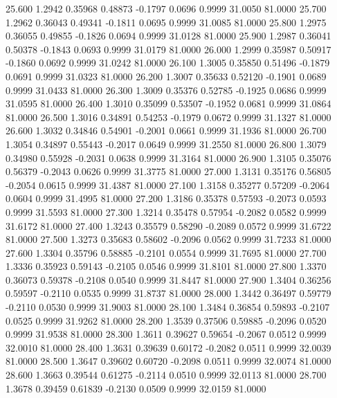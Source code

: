   25.600   1.2942   0.35968   0.48873  -0.1797   0.0696   0.9999  31.0050  81.0000
  25.700   1.2962   0.36043   0.49341  -0.1811   0.0695   0.9999  31.0085  81.0000
  25.800   1.2975   0.36055   0.49855  -0.1826   0.0694   0.9999  31.0128  81.0000
  25.900   1.2987   0.36041   0.50378  -0.1843   0.0693   0.9999  31.0179  81.0000
  26.000   1.2999   0.35987   0.50917  -0.1860   0.0692   0.9999  31.0242  81.0000
  26.100   1.3005   0.35850   0.51496  -0.1879   0.0691   0.9999  31.0323  81.0000
  26.200   1.3007   0.35633   0.52120  -0.1901   0.0689   0.9999  31.0433  81.0000
  26.300   1.3009   0.35376   0.52785  -0.1925   0.0686   0.9999  31.0595  81.0000
  26.400   1.3010   0.35099   0.53507  -0.1952   0.0681   0.9999  31.0864  81.0000
  26.500   1.3016   0.34891   0.54253  -0.1979   0.0672   0.9999  31.1327  81.0000
  26.600   1.3032   0.34846   0.54901  -0.2001   0.0661   0.9999  31.1936  81.0000
  26.700   1.3054   0.34897   0.55443  -0.2017   0.0649   0.9999  31.2550  81.0000
  26.800   1.3079   0.34980   0.55928  -0.2031   0.0638   0.9999  31.3164  81.0000
  26.900   1.3105   0.35076   0.56379  -0.2043   0.0626   0.9999  31.3775  81.0000
  27.000   1.3131   0.35176   0.56805  -0.2054   0.0615   0.9999  31.4387  81.0000
  27.100   1.3158   0.35277   0.57209  -0.2064   0.0604   0.9999  31.4995  81.0000
  27.200   1.3186   0.35378   0.57593  -0.2073   0.0593   0.9999  31.5593  81.0000
  27.300   1.3214   0.35478   0.57954  -0.2082   0.0582   0.9999  31.6172  81.0000
  27.400   1.3243   0.35579   0.58290  -0.2089   0.0572   0.9999  31.6722  81.0000
  27.500   1.3273   0.35683   0.58602  -0.2096   0.0562   0.9999  31.7233  81.0000
  27.600   1.3304   0.35796   0.58885  -0.2101   0.0554   0.9999  31.7695  81.0000
  27.700   1.3336   0.35923   0.59143  -0.2105   0.0546   0.9999  31.8101  81.0000
  27.800   1.3370   0.36073   0.59378  -0.2108   0.0540   0.9999  31.8447  81.0000
  27.900   1.3404   0.36256   0.59597  -0.2110   0.0535   0.9999  31.8737  81.0000
  28.000   1.3442   0.36497   0.59779  -0.2110   0.0530   0.9999  31.9003  81.0000
  28.100   1.3484   0.36854   0.59893  -0.2107   0.0525   0.9999  31.9262  81.0000
  28.200   1.3539   0.37506   0.59885  -0.2096   0.0520   0.9999  31.9538  81.0000
  28.300   1.3611   0.39627   0.59654  -0.2067   0.0512   0.9999  32.0010  81.0000
  28.400   1.3631   0.39639   0.60172  -0.2082   0.0511   0.9999  32.0039  81.0000
  28.500   1.3647   0.39602   0.60720  -0.2098   0.0511   0.9999  32.0074  81.0000
  28.600   1.3663   0.39544   0.61275  -0.2114   0.0510   0.9999  32.0113  81.0000
  28.700   1.3678   0.39459   0.61839  -0.2130   0.0509   0.9999  32.0159  81.0000
